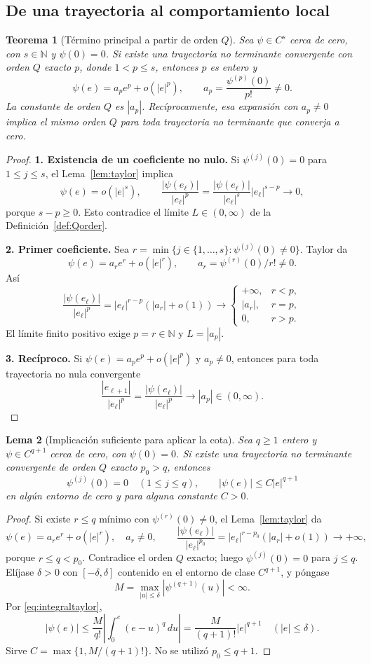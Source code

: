 \documentclass[11pt,a4paper]{article}
\numberwithin{equation}{section}
\newtheorem{theorem}{Teorema}[section]
\newtheorem{lemma}[theorem]{Lema}
\theoremstyle{definition}
\theoremstyle{remark}
\newcommand{\N}{\mathbb N}
\newcommand{\paso}[1]{\par\smallskip\noindent\textbf{#1}\quad}
\begin{document}
\subsection{De una trayectoria al comportamiento local}
\begin{theorem}[Término principal a partir de orden $Q$]\label{thm:Qprincipal}
Sea $\psi\in C^s$ cerca de cero, con $s\in\N$ y $\psi(0)=0$. Si existe una trayectoria no terminante convergente con orden $Q$ exacto $p$, donde $1<p\le s$, entonces $p$ es entero y
\[
\psi(e)=a_pe^p+o(|e|^p),\qquad
 a_p=\frac{\psi^{(p)}(0)}{p!}\ne0.
\]
La constante de orden $Q$ es $|a_p|$. Recíprocamente, esa expansión con $a_p\ne0$ implica el mismo orden $Q$ para toda trayectoria no terminante que converja a cero.
\end{theorem}
\begin{proof}
\paso{1. Existencia de un coeficiente no nulo.}
Si $\psi^{(j)}(0)=0$ para $1\le j\le s$, el Lema~\ref{lem:taylor} implica
\[
\psi(e)=o(|e|^s),\qquad
\frac{|\psi(e_\ell)|}{|e_\ell|^p}
=\frac{|\psi(e_\ell)|}{|e_\ell|^s}|e_\ell|^{s-p}\to0,
\]
porque $s-p\ge0$. Esto contradice el límite $L\in(0,\infty)$ de la Definición~\ref{def:Qorder}.
\paso{2. Primer coeficiente.}
Sea $r=\min\{j\in\{1,\ldots,s\}:\psi^{(j)}(0)\ne0\}$. Taylor da
\[
\psi(e)=a_re^r+o(|e|^r),\qquad a_r=\psi^{(r)}(0)/r!\ne0.
\]
Así
\[
\frac{|\psi(e_\ell)|}{|e_\ell|^p}
=|e_\ell|^{r-p}(|a_r|+o(1))\longrightarrow
\begin{cases}+\infty,&r<p,\\|a_r|,&r=p,\\0,&r>p.
\end{cases}
\]
El límite finito positivo exige $p=r\in\N$ y $L=|a_p|$.
\paso{3. Recíproco.}
Si $\psi(e)=a_pe^p+o(|e|^p)$ y $a_p\ne0$, entonces para toda trayectoria no nula convergente
\[
\frac{|e_{\ell+1}|}{|e_\ell|^p}
=\frac{|\psi(e_\ell)|}{|e_\ell|^p}\to|a_p|\in(0,\infty).
\]
\end{proof}

\begin{lemma}[Implicación suficiente para aplicar la cota]\label{lem:Qbridge}
Sea $q\ge1$ entero y $\psi\in C^{q+1}$ cerca de cero, con $\psi(0)=0$. Si existe una trayectoria no terminante convergente de orden $Q$ exacto $p_0>q$, entonces
\[
\psi^{(j)}(0)=0\quad(1\le j\le q),\qquad
|\psi(e)|\le C|e|^{q+1}
\]
en algún entorno de cero y para alguna constante $C>0$.
\end{lemma}
\begin{proof}
Si existe $r\le q$ mínimo con $\psi^{(r)}(0)\ne0$, el Lema~\ref{lem:taylor} da
\[
\psi(e)=a_re^r+o(|e|^r),\quad a_r\ne0,\qquad
\frac{|\psi(e_\ell)|}{|e_\ell|^{p_0}}
=|e_\ell|^{r-p_0}(|a_r|+o(1))\to+\infty,
\]
porque $r\le q<p_0$. Contradice el orden $Q$ exacto; luego $\psi^{(j)}(0)=0$ para $j\le q$.
Elíjase $\delta>0$ con $[-\delta,\delta]$ contenido en el entorno de clase $C^{q+1}$, y póngase
\[
M=\max_{|u|\le\delta}|\psi^{(q+1)}(u)|<\infty.
\]
Por \eqref{eq:integraltaylor},
\[
|\psi(e)|\le\frac{M}{q!}\left|\int_0^e(e-u)^q\,du\right|
=\frac{M}{(q+1)!}|e|^{q+1}\quad(|e|\le\delta).
\]
Sirve $C=\max\{1,M/(q+1)!\}$. No se utilizó $p_0\le q+1$.
\end{proof}
\end{document}
